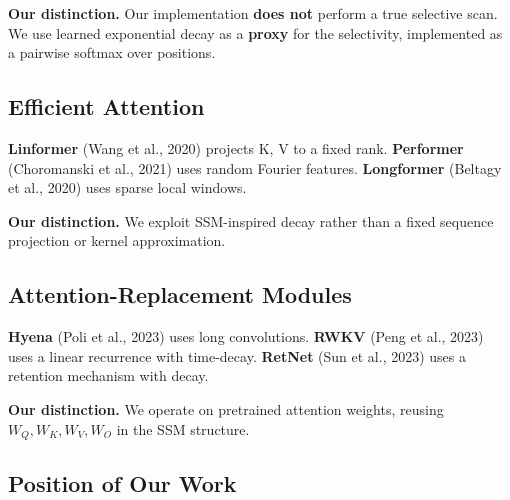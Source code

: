 \textbf{Our distinction.} Our implementation \textbf{does not} perform a true selective 
scan. We use learned exponential decay as a \textbf{proxy} for the selectivity, 
implemented as a pairwise softmax over positions.

\subsection{Efficient Attention}

\textbf{Linformer} (Wang et al., 2020) projects K, V to a fixed rank. 
\textbf{Performer} (Choromanski et al., 2021) uses random Fourier features. 
\textbf{Longformer} (Beltagy et al., 2020) uses sparse local windows.

\textbf{Our distinction.} We exploit SSM-inspired decay rather than a fixed 
sequence projection or kernel approximation.

\subsection{Attention-Replacement Modules}

\textbf{Hyena} (Poli et al., 2023) uses long convolutions. \textbf{RWKV} (Peng et al., 
2023) uses a linear recurrence with time-decay. \textbf{RetNet} (Sun et al., 2023) 
uses a retention mechanism with decay.

\textbf{Our distinction.} We operate on pretrained attention weights, reusing 
$W_Q, W_K, W_V, W_O$ in the SSM structure.

\subsection{Position of Our Work}

